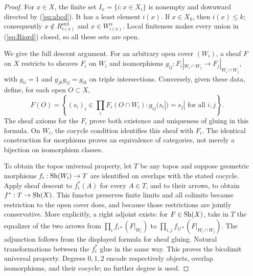\begin{proof}
For $x\in X$, the finite set $I_x=\{i:x\in X_i\}$ is nonempty and downward
directed by (\ref{eq:abcd}). It has a least element $i(x)$. If $x\in X_k$,
then $i(x)\leq k$; consequently $x\notin R_{i(x)}^{\mathrm{ord}}$ and
$x\in W_{i(x)}^\alpha$. Local finiteness makes every union in
(\ref{eq:Riord}) closed, so all these sets are open.

We give the full descent argument. For an arbitrary open cover $(W_i)$,
a sheaf $F$ on $X$ restricts to sheaves $F_i$ on $W_i$ and isomorphisms
$g_{ij}:F_i|_{W_i\cap W_j}\to F_j|_{W_i\cap W_j}$, with
$g_{ii}=1$ and $g_{jk}g_{ij}=g_{ik}$ on triple intersections. Conversely,
given these data, define, for each open $O\subset X$,
\[
 F(O)=\left\{(s_i)_i\in\prod_i F_i(O\cap W_i):
             g_{ij}(s_i|)=s_j|\text{ for all }i,j\right\}.
\]
The sheaf axioms for the $F_i$ prove both existence and uniqueness of
gluing in this formula. On $W_i$, the cocycle condition identifies this
sheaf with $F_i$. The identical construction for morphisms proves an
equivalence of categories, not merely a bijection on isomorphism classes.

To obtain the topos universal property, let $T$ be any topos and suppose
geometric morphisms $f_i:\operatorname{Sh}(W_i)\to T$ are identified on overlaps with
the stated cocycle. Apply sheaf descent to $f_i^*(A)$ for every $A\in T$,
and to their arrows, to obtain $f^*:T\to\operatorname{Sh}(X)$. This functor preserves
finite limits and all colimits because restriction to the open cover does,
and because those restrictions are jointly conservative. More explicitly,
a right adjoint exists: for $F\in\operatorname{Sh}(X)$, take in $T$ the equalizer of
the two arrows from $\prod_i f_{i*}(F|_{W_i})$ to
$\prod_{i,j}f_{ij*}(F|_{W_i\cap W_j})$. The adjunction follows from the
displayed formula for sheaf gluing. Natural transformations between the
$f_i^*$ glue in the same way. This proves the bicolimit universal property.
Degrees $0,1,2$ encode respectively objects, overlap isomorphisms, and
their cocycle; no further degree is used.


\end{proof}

